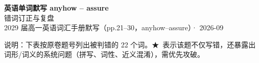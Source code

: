 \documentclass[11pt,a4paper]{article}
\newcommand{\STAR}{\textcolor{wrongred}{\starfont ★}}
\begin{document}
\begin{center}
{\LARGE\bfseries 英语单词默写 anyhow -- assure}\\[0.25em]
{\large 错词订正与复盘}\\[0.35em]
{\footnotesize 2029 届高一英语词汇手册默写（pp.21--30，anyhow--assure）· 2026-09}
\end{center}

\vspace{-0.2em}
\noindent{\color{rulegray}\rule{\textwidth}{0.8pt}}

\vspace{0.7em}
\noindent{}

\vspace{0.8em}
\noindent 说明：下表按原卷题号列出被判错的 22 个词。\STAR\ 表示该题不仅写错，还暴露出词形/词义的系统问题（拼写、词性、近义混淆），需优先攻破。
\end{document}
